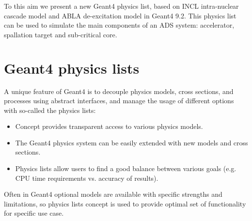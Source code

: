 \documentclass[a4paper]{jpconf}
\begin{document}
To this aim we present a new Geant4 physics list, 
based on INCL \cite{incl} intra-nuclear cascade model and ABLA de-excitation model \cite{abla, abla1, abla2} in Geant4 9.2. 
This physics list can be used to simulate the main components of an ADS system: accelerator, spallation
target and sub-critical core.



\section{Geant4 physics lists}\label{sec:list}

A unique feature of Geant4 is to decouple physics models, cross sections, and processes
using abstract interfaces, and manage the usage of different options with so-called the physics lists:
\begin{itemize}
\item Concept provides transparent access to various physics models.
\item The Geant4 physics system can be easily extended with new models and cross sections.
\item Physics lists allow users to find a good balance between various goals 
(e.g. CPU time requirements vs. accuracy of results).
\end{itemize}

Often in Geant4 optional models are available with specific strengths and limitations, 
so physics lists concept is used to provide optimal set of functionality for specific use case.
\end{document}
